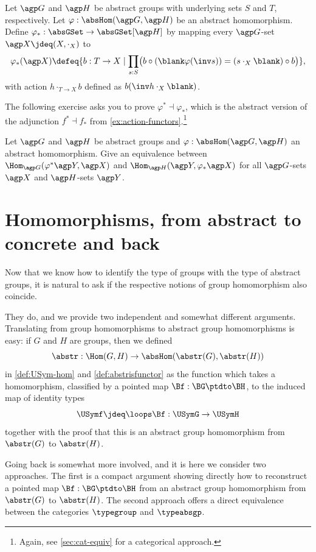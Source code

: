 \begin{definition}\label{def:phi_*}
Let $\agp G$ and $\agp H$ be abstract groups
with underlying sets $S$ and $T$, respectively.
Let $\varphi : \absHom(\agp G, \agp H)$ be an abstract homomorphism.
Define $\varphi_* : \absGSet \to \absGSet[\agp H]$
by mapping every $\agp G$-set $\agp X \jdeq (X,\cdot_X)$ to
\[
  \varphi_*(\agp X) \defeq 
  \{ b:T\to X \mid \prod_{s:S}\bigl(b\circ(\blank\varphi(\inv s)) =
                                   (s\cdot_X\blank)\circ b\bigr)\},
\]
with action $h\cdot_{T\to X} b$ defined as $b(\inv h \cdot_X \blank)$.
\end{definition}
The following exercise asks you to prove $\varphi^* \dashv \varphi_*$,
which is the abstract version of the adjunction $f^* \dashv f_*$ 
from \cref{ex:action-functors}.\footnote{Again, see \cref{sec:cat-equiv}
for a categorical approach.}
\begin{xca}\label{xca:phi^*-|phi_*}
Let $\agp G$ and $\agp H$ be abstract groups
and $\varphi : \absHom(\agp G, \agp H)$ an abstract homomorphism.
Give an equivalence between
$\Hom_{\agp G}(\varphi^*\agp Y,\agp X)$ and 
$\Hom_{\agp H}(\agp Y,\varphi_*\agp X)$
for all $\agp G$-sets $\agp X$ and $\agp H$-sets $\agp Y$.
\end{xca}

\section{Homomorphisms, from abstract to concrete and back}
\label{sec:homabsisconcr}

Now that we know how to identify the type of groups with the type 
of abstract groups, it is natural to ask if the respective notions of 
group homomorphism also coincide.

They do, and we provide two independent and somewhat different arguments.
Translating from group homomorphisms to abstract group homomorphisms is easy:
if $G$ and $H$ are groups, then we defined
$$\abstr:\Hom(G,H)\to\absHom(\abstr(G),\abstr(H))$$
in \cref{def:USym-hom} and \cref{def:abstrisfunctor} as the function
which takes a homomorphism, classified by a pointed map $\Bf:\BG\ptdto\BH$,
to the induced map of identity types
$$\USymf \jdeq \loops\Bf:\USymG\to\USymH$$
together with the proof that this is an abstract group 
homomorphism from $\abstr(G)$ to $\abstr(H)$.

Going back is somewhat more involved, and it is here we consider
two approaches. The first is a compact argument showing directly how to
reconstruct a pointed map $\Bf:\BG\ptdto\BH$ from an abstract group
homomorphism from $\abstr(G)$ to $\abstr(H)$. The second approach offers
a direct equivalence between the categories $\typegroup$ and $\typeabsgp$.

